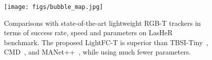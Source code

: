\begin{figure}
\centering
\texttt{[image: figs/bubble\_map.jpg]}
\caption{Comparisons with state-of-the-art lightweight RGB-T trackers in terms of success rate, speed and parameters on LasHeR~\cite{lasher} benchmark. The proposed LightFC-T is superior than TBSI-Tiny~\cite{tbsi}, CMD~\cite{cmd}, and MANet++~\cite{manetpp}, while using much fewer parameters. }
\label{fig:bubblemap}
\end{figure}
